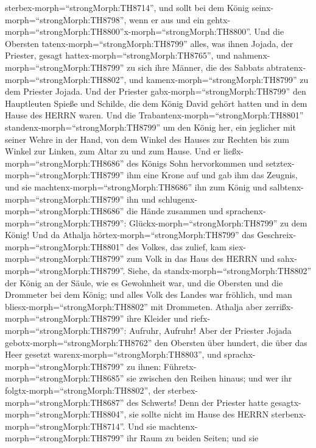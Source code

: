 sterbex-morph=``strongMorph:TH8714'', und sollt bei dem König
seinx-morph=``strongMorph:TH8798'', wenn er aus und ein
gehtx-morph=``strongMorph:TH8800''x-morph=``strongMorph:TH8800''.
 Und die Obersten tatenx-morph=``strongMorph:TH8799'' alles,
was ihnen Jojada, der Priester, gesagt
hattex-morph=``strongMorph:TH8765'', und
nahmenx-morph=``strongMorph:TH8799'' zu sich ihre Männer, die des
Sabbats abtratenx-morph=``strongMorph:TH8802'', und
kamenx-morph=``strongMorph:TH8799'' zu dem Priester Jojada.
 Und der Priester gabx-morph=``strongMorph:TH8799'' den
Hauptleuten Spieße und Schilde, die dem König David gehört hatten und in
dem Hause des HERRN waren.  Und die
Trabantenx-morph=``strongMorph:TH8801''
standenx-morph=``strongMorph:TH8799'' um den König her, ein jeglicher
mit seiner Wehre in der Hand, von dem Winkel des Hauses zur Rechten bis
zum Winkel zur Linken, zum Altar zu und zum Hause.  Und er
ließx-morph=``strongMorph:TH8686'' des Königs Sohn hervorkommen und
setztex-morph=``strongMorph:TH8799'' ihm eine Krone auf und gab ihm das
Zeugnis, und sie machtenx-morph=``strongMorph:TH8686'' ihn zum König und
salbtenx-morph=``strongMorph:TH8799'' ihn und
schlugenx-morph=``strongMorph:TH8686'' die Hände zusammen und
sprachenx-morph=``strongMorph:TH8799'':
Glückx-morph=``strongMorph:TH8799'' zu dem König!  Und da
Athalja hörtex-morph=``strongMorph:TH8799'' das
Geschreix-morph=``strongMorph:TH8801'' des Volkes, das zulief, kam
siex-morph=``strongMorph:TH8799'' zum Volk in das Haus des HERRN
 und sahx-morph=``strongMorph:TH8799''. Siehe, da
standx-morph=``strongMorph:TH8802'' der König an der Säule, wie es
Gewohnheit war, und die Obersten und die Drommeter bei dem König; und
alles Volk des Landes war fröhlich, und man
bliesx-morph=``strongMorph:TH8802'' mit Drommeten. Athalja aber
zerrißx-morph=``strongMorph:TH8799'' ihre Kleider und
riefx-morph=``strongMorph:TH8799'': Aufruhr, Aufruhr!  Aber
der Priester Jojada gebotx-morph=``strongMorph:TH8762'' den Obersten
über hundert, die über das Heer gesetzt
warenx-morph=``strongMorph:TH8803'', und
sprachx-morph=``strongMorph:TH8799'' zu ihnen:
Führetx-morph=``strongMorph:TH8685'' sie zwischen den Reihen hinaus; und
wer ihr folgtx-morph=``strongMorph:TH8802'', der
sterbex-morph=``strongMorph:TH8687'' des Schwerts! Denn der Priester
hatte gesagtx-morph=``strongMorph:TH8804'', sie sollte nicht im Hause
des HERRN sterbenx-morph=``strongMorph:TH8714''.  Und sie
machtenx-morph=``strongMorph:TH8799'' ihr Raum zu beiden Seiten; und sie
